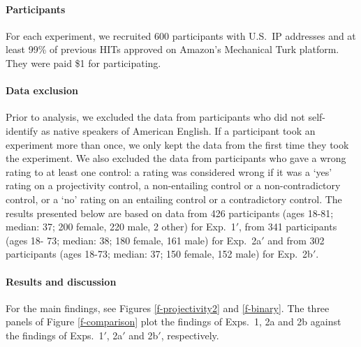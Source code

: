 \documentclass[11pt,fleqn]{article}
\newcommand{\6}{\mbox{$[\hspace*{-.6mm}[$}}
\newcommand{\9}{\mbox{$]\hspace*{-.6mm}]$}}
\begin{document}
{\paragraph{Participants} For each experiment, we recruited 600 participants with U.S.\ IP addresses and at least 99\% of previous HITs approved on Amazon's Mechanical Turk platform. They were paid \$1 for participating. 

\paragraph{Data exclusion} Prior to analysis, we excluded the data from participants who did not self-identify as native speakers of American English. If a participant took an experiment more than once, we only kept the data from the first time they took the experiment. We also excluded the data from participants who gave a wrong rating to at least one control: a rating was considered wrong if it was a `yes' rating on a projectivity control, a non-entailing control or a non-contradictory control, or a `no' rating on an entailing control or a contradictory control. The results presented below are based on data from 426 participants (ages 18-81; median: 37; 200 female, 220 male, 2 other) for Exp.~1$'$, from 341 participants (ages 18- 73; median: 38; 180 female, 161 male) for Exp.~2a$'$ and from 302 participants (ages 18-73; median: 37; 150 female, 152 male) for Exp.~2b$'$.

\paragraph{Results and discussion} For the main findings, see Figures \ref{f-projectivity2} and \ref{f-binary}. The three panels of Figure \ref{f-comparison} plot the findings of Exps.~1, 2a and 2b against the findings of Exps.~1$'$, 2a$'$ and 2b$'$, respectively.
    
\begin{figure}[h!]
\centering


\end{figure}}
\end{document}
